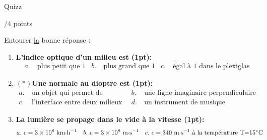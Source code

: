\begin{doc}{Quizz \begin{Large}
    /4 points
\end{Large}}
Entourer \underline{la} bonne réponse :
\begin{enumerate}
    \item \textbf{L'indice optique d'un milieu est (1pt):}
        \begin{align*}
            a.& ~\text{plus petit que 1} & b.& ~\text{plus grand que 1} & c.& ~\text{égal à 1 dans le plexiglas} 
        \end{align*}
    \item \textbf{$(*)$Une normale au dioptre est (1pt):}
        \begin{align*}
            a.& ~\text{un objet qui permet de disperser la lumière} & b.&~\text{une ligne imaginaire perpendiculaire à l'interface} \\
            c.& ~\text{l'interface entre deux milieux différents} & d.&~\text{un instrument de musique}
        \end{align*}
    \item \textbf{La lumière se propage dans le vide à la vitesse (1pt):}
        \begin{align*}
            a.& ~\text{$c=3\times10^8$~km$\cdot$h$^{-1}$} & b.& ~\text{$c=3\times10^8$~m$\cdot$s$^{-1}$} & c.& ~\text{$c=340$~m$\cdot$s$^{-1}$ à la température T=15$\degreCelsius$}

\end{align*}
\end{enumerate}
\end{doc}
